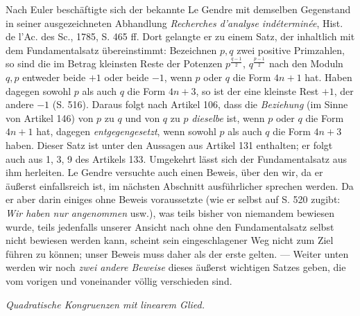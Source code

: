 Nach Euler beschäftigte sich der bekannte Le Gendre mit demselben Gegenstand in seiner ausgezeichneten Abhandlung \textit{Recherches d'analyse indéterminée}, Hist. de l'Ac. des Sc., 1785, S. 465 ff. Dort gelangte er zu einem Satz, der inhaltlich mit dem Fundamentalsatz übereinstimmt: Bezeichnen $p,q$ zwei positive Primzahlen, so sind die im Betrag kleinsten Reste der Potenzen $p^{\frac{q-1}{2}}$, $q^{\frac{p-1}{2}}$ nach den Moduln $q,p$ entweder beide $+1$ oder beide $-1$, wenn $p$ oder $q$ die Form $4n+1$ hat. Haben dagegen sowohl $p$ als auch $q$ die Form $4n+3$, so ist der eine kleinste Rest $+1$, der andere $-1$ (S. 516). Daraus folgt nach Artikel 106, dass die \textit{Beziehung} (im Sinne von Artikel 146) von $p$ zu $q$ und von $q$ zu $p$ \textit{dieselbe} ist, wenn $p$ oder $q$ die Form $4n+1$ hat, dagegen \textit{entgegengesetzt}, wenn sowohl $p$ als auch $q$ die Form $4n+3$ haben. Dieser Satz ist unter den Aussagen aus Artikel 131 enthalten; er folgt auch aus 1, 3, 9 des Artikels 133. Umgekehrt lässt sich der Fundamentalsatz aus ihm herleiten. Le Gendre versuchte auch einen Beweis, über den wir, da er äußerst einfallsreich ist, im nächsten Abschnitt ausführlicher sprechen werden. Da er aber darin einiges ohne Beweis voraussetzte (wie er selbst auf S. 520 zugibt: \textit{Wir haben nur angenommen} usw.), was teils bisher von niemandem bewiesen wurde, teils jedenfalls unserer Ansicht nach ohne den Fundamentalsatz selbst nicht bewiesen werden kann, scheint sein eingeschlagener Weg nicht zum Ziel führen zu können; unser Beweis muss daher als der erste gelten. --- Weiter unten werden wir noch \textit{zwei andere Beweise} dieses äußerst wichtigen Satzes geben, die vom vorigen und voneinander völlig verschieden sind.

\begin{center}\textit{Quadratische Kongruenzen mit linearem Glied.}\end{center}

